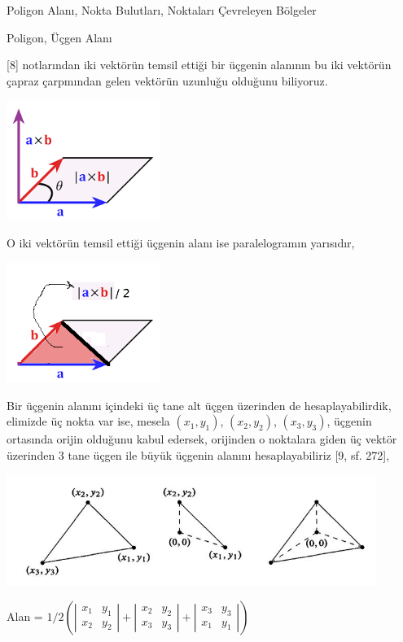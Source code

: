 \documentclass[12pt,fleqn]{article}\usepackage{../../common}
\begin{document}
Poligon Alanı, Nokta Bulutları, Noktaları Çevreleyen Bölgeler

Poligon, Üçgen Alanı

[8] notlarından iki vektörün temsil ettiği bir üçgenin alanının bu iki vektörün
çapraz çarpmından gelen vektörün uzunluğu olduğunu biliyoruz. 

\includegraphics[width=5cm]{triar4.png}

O iki vektörün temsil ettiği üçgenin alanı ise paralelogramın yarısıdır,

\includegraphics[width=5cm]{triar3.png}

Bir üçgenin alanını içindeki üç tane alt üçgen üzerinden de hesaplayabilirdik,
elimizde üç nokta var ise, mesela $(x_1,y_1)$, $(x_2,y_2)$, $(x_3,y_3)$, üçgenin
ortasında orijin olduğunu kabul edersek, orijinden o noktalara giden üç vektör
üzerinden 3 tane üçgen ile büyük üçgenin alanını hesaplayabiliriz [9, sf. 272],

\includegraphics[width=12cm]{triar5.jpg}

Alan = $1/2 \left( 
\left|\begin{array}{cc}
x_1 & y_1 \\ x_2 & y_2 
\end{array}\right| + 
\left|\begin{array}{cc}
x_2 & y_2 \\ x_3 & y_3 
\end{array}\right| + 
\left|\begin{array}{cc}
x_3 & y_3 \\ x_1 & y_1
\end{array}\right| \right)
$
\end{document}
